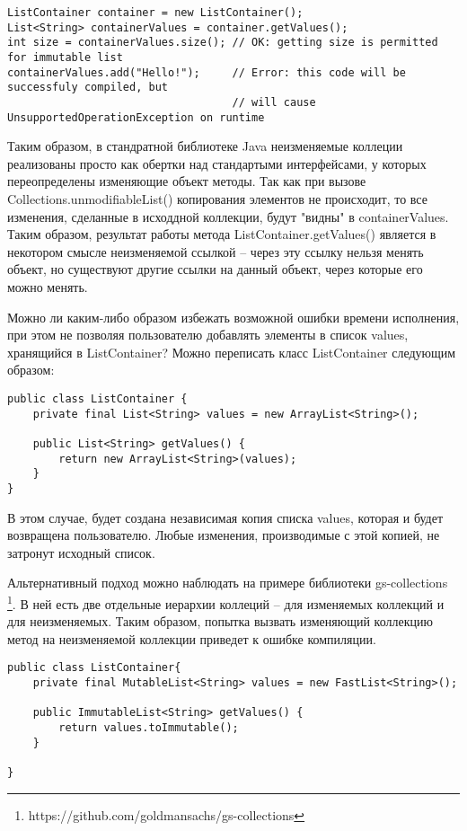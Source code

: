 \begin{lstlisting}[caption=Использование неизменяемого списка, label=code:java_immutable_list_usage]
ListContainer container = new ListContainer();
List<String> containerValues = container.getValues();
int size = containerValues.size(); // OK: getting size is permitted for immutable list
containerValues.add("Hello!");     // Error: this code will be successfuly compiled, but 
	                               // will cause UnsupportedOperationException on runtime	
\end{lstlisting}

Таким образом, в стандратной библиотеке Java неизменяемые коллеции реализованы просто как обертки над стандартыми интерфейсами, у которых переопределены изменяющие объект методы. Так как при вызове Collections.unmodifiableList() копирования элементов не происходит, то все изменения, сделанные в исходдной коллекции, будут "видны" в containerValues. Таким образом, результат работы метода ListContainer.getValues() является в некотором смысле неизменяемой ссылкой -- через эту ссылку нельзя менять объект, но существуют другие ссылки на данный объект, через которые его можно менять.

Можно ли каким-либо образом избежать возможной ошибки времени исполнения, при этом не позволяя пользователю добавлять элементы в список values, хранящийся в ListContainer? Можно переписать класс ListContainer следующим образом:

\begin{lstlisting}[caption=Неизменяемый список, label=code:java_immutable_list]
public class ListContainer {
    private final List<String> values = new ArrayList<String>();   
    
    public List<String> getValues() {
        return new ArrayList<String>(values);
    }    
}
\end{lstlisting}

В этом случае, будет создана независимая копия списка values, которая и будет возвращена пользователю. Любые изменения, производимые с этой копией, не затронут исходный список. 

Альтернативный подход можно наблюдать на примере библиотеки gs-collections \footnote{https://github.com/goldmansachs/gs-collections}. В ней есть две отдельные иерархии коллеций -- для изменяемых коллекций и для неизменяемых. Таким образом, попытка вызвать изменяющий коллекцию метод на неизменяемой коллекции приведет к ошибке компиляции.

\begin{lstlisting}[caption=Неизменяемый список, label=code:java_immutable_list]
public class ListContainer{
    private final MutableList<String> values = new FastList<String>();   
    
    public ImmutableList<String> getValues() {
        return values.toImmutable();
    }
    
}
\end{lstlisting}


